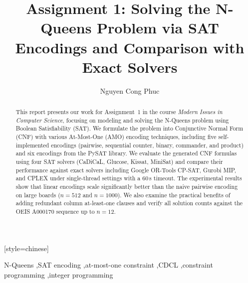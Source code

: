 \documentclass[a4paper,fleqn]{cas-sc}
\begin{document}
\let\WriteBookmarks\relax
\renewcommand{\topfraction}{0.95}
\renewcommand{\bottomfraction}{0.85}
\renewcommand{\textfraction}{0.05}
\renewcommand{\floatpagefraction}{0.85}


\title[mode=title]{Assignment 1: Solving the N-Queens Problem via SAT Encodings and Comparison with Exact Solvers}

\author[1]{Nguyen Cong Phuc}[style=chinese]
\fnmark[1]



\begin{abstract}
This report presents our work for Assignment~1 in the course \emph{Modern Issues in Computer Science}, focusing on modeling and solving the N-Queens problem using Boolean Satisfiability (SAT). We formulate the problem into Conjunctive Normal Form (CNF) with various At-Most-One (AMO) encoding techniques, including five self-implemented encodings (pairwise, sequential counter, binary, commander, and product) and six encodings from the PySAT library. We evaluate the generated CNF formulas using four SAT solvers (CaDiCaL, Glucose, Kissat, MiniSat) and compare their performance against exact solvers including Google OR-Tools CP-SAT, Gurobi MIP, and CPLEX under single-thread settings with a 60\,s timeout. The experimental results show that linear encodings scale significantly better than the naive pairwise encoding on large boards ($n=512$ and $n=1000$). We also examine the practical benefits of adding redundant column at-least-one clauses and verify all solution counts against the OEIS A000170 sequence up to $n=12$.
\end{abstract}

\begin{keywords}
N-Queens \sep SAT encoding \sep at-most-one constraint \sep CDCL \sep constraint programming \sep integer programming
\end{keywords}

\maketitle
\end{document}
